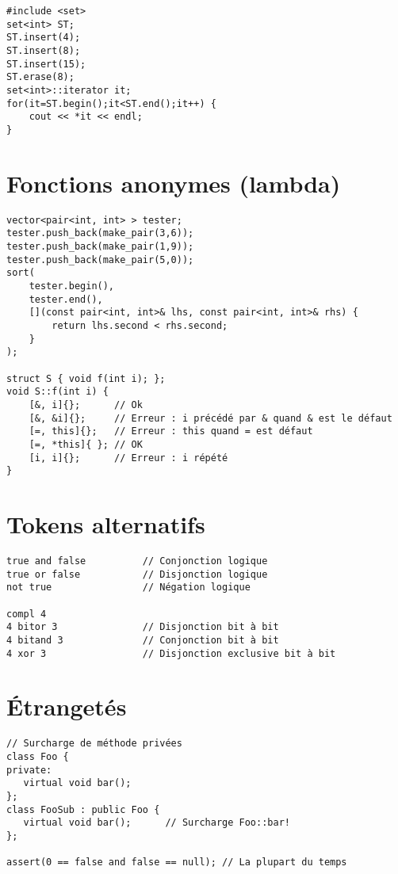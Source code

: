 \documentclass{article}
\begin{document}
\begin{multicols*}{3}
\begin{lstlisting}
#include <set>
set<int> ST;
ST.insert(4);
ST.insert(8);
ST.insert(15);
ST.erase(8);
set<int>::iterator it;
for(it=ST.begin();it<ST.end();it++) {
    cout << *it << endl;
}
\end{lstlisting}

\section*{Fonctions anonymes (lambda)}

\begin{lstlisting}
vector<pair<int, int> > tester;
tester.push_back(make_pair(3,6));
tester.push_back(make_pair(1,9));
tester.push_back(make_pair(5,0));
sort(
    tester.begin(),
    tester.end(),
    [](const pair<int, int>& lhs, const pair<int, int>& rhs) {
        return lhs.second < rhs.second;
    }
);

struct S { void f(int i); };
void S::f(int i) {
    [&, i]{};      // Ok
    [&, &i]{};     // Erreur : i précédé par & quand & est le défaut
    [=, this]{};   // Erreur : this quand = est défaut
    [=, *this]{ }; // OK
    [i, i]{};      // Erreur : i répété
}
\end{lstlisting}

\section*{Tokens alternatifs}

\begin{lstlisting}
true and false          // Conjonction logique
true or false           // Disjonction logique
not true                // Négation logique

compl 4
4 bitor 3               // Disjonction bit à bit
4 bitand 3              // Conjonction bit à bit
4 xor 3                 // Disjonction exclusive bit à bit
\end{lstlisting}

\section*{Étrangetés}

\begin{lstlisting}
// Surcharge de méthode privées
class Foo {
private:
   virtual void bar();
};
class FooSub : public Foo {
   virtual void bar();      // Surcharge Foo::bar!
};

assert(0 == false and false == null); // La plupart du temps



\end{lstlisting}

\end{multicols*}
\end{document}
